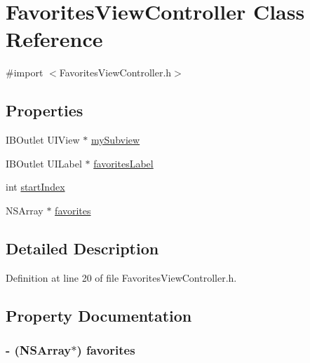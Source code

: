 \hypertarget{interface_favorites_view_controller}{
\section{FavoritesViewController Class Reference}
\label{interface_favorites_view_controller}
}


{\ttfamily \#import $<$FavoritesViewController.h$>$}

\subsection*{Properties}
\begin{DoxyCompactItemize}
\item 
IBOutlet UIView $\ast$ \hyperlink{interface_favorites_view_controller_acc52a7c4d35472a5e41a1e078081435b}{mySubview}
\item 
IBOutlet UILabel $\ast$ \hyperlink{interface_favorites_view_controller_af00ceee5705d944d57b8c8e46d3cca55}{favoritesLabel}
\item 
int \hyperlink{interface_favorites_view_controller_a01f10c7a68420aff91a418cf1f39de6f}{startIndex}
\item 
NSArray $\ast$ \hyperlink{interface_favorites_view_controller_a2c05acc59f8b3621925628734f13afe5}{favorites}
\end{DoxyCompactItemize}


\subsection{Detailed Description}


Definition at line 20 of file FavoritesViewController.h.



\subsection{Property Documentation}
\hypertarget{interface_favorites_view_controller_a2c05acc59f8b3621925628734f13afe5}{
\subsubsection[{favorites}]{\setlength{\rightskip}{0pt plus 5cm}-\/ (NSArray$\ast$) favorites}}
\label{interface_favorites_view_controller_a2c05acc59f8b3621925628734f13afe5}


